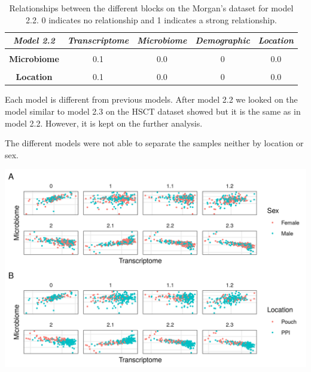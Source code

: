 \documentclass[
  12pt,
  a4paper,
  twoside,
  openright]{book}
\let\origfigure\figure
\let\endorigfigure\endfigure
\renewenvironment{figure}[1][2] {
    \expandafter\origfigure\expandafter[!htp]
} {
    \endorigfigure
}
\begin{document}
\begin{table}[H]

\caption[Model 2.2 of the Morgan's dataset.]{\label{tab:morgan-model2-2}Relationships between the different blocks on the Morgan's dataset for model 2.2. 0 indicates no relationship and 1 indicates a strong relationship.}
\centering
\begin{tabular}[t]{|>{}c|c|c|c|>{}c|}
\hline
\em{\textbf{Model 2.2}} & \em{\textbf{Transcriptome}} & \em{\textbf{Microbiome}} & \em{\textbf{Demographic}} & \em{\textbf{Location}}\\
\hline
\textbf{\cellcolor{gray!6}{Transcriptome}} & \cellcolor{gray!6}{0.0} & \cellcolor{gray!6}{0.1} & \cellcolor{gray!6}{1} & \cellcolor{gray!6}{0.1}\\
\hline
\textbf{Microbiome} & 0.1 & 0.0 & 0 & 0.0\\
\hline
\textbf{\cellcolor{gray!6}{Demographic}} & \cellcolor{gray!6}{1.0} & \cellcolor{gray!6}{0.0} & \cellcolor{gray!6}{0} & \cellcolor{gray!6}{0.0}\\
\hline
\textbf{Location} & 0.1 & 0.0 & 0 & 0.0\\
\hline
\end{tabular}
\end{table}

Each model is different from previous models.
After model 2.2 we looked on the model similar to model 2.3 on the HSCT dataset showed but it is the same as in model 2.2.
However, it is kept on the further analysis.

The different models were not able to separate the samples neither by location or sex.

\begin{figure}
\includegraphics[width=1\linewidth]{images/morgan_models} \caption[Models from inteRmodel on the Morgan's dataset. ]{Models from inteRmodel on the Morgan's dataset. First component of the transcriptome and microbiome of models on the Morgan's dataset. Model 0 without sample data. Model 1 to 1.2 with all the sample data in a single block and models 2.1 to 2.3 with sample data in several blocks. Panel A shows samples colored by sex and panel B by segment of the sample. There is no clear classification neither by location nor sex on any of the models.}\label{fig:morgan-models}
\end{figure}
\end{document}
